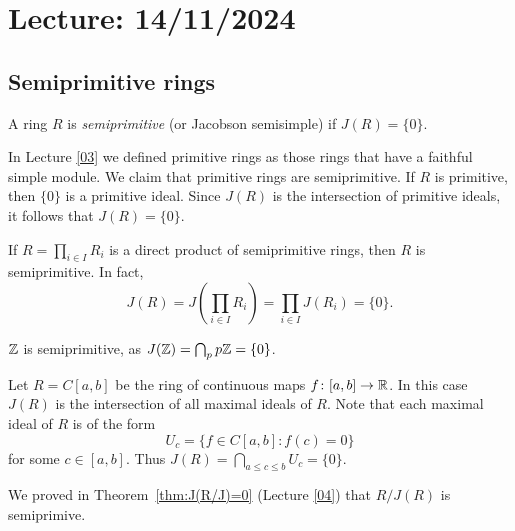 \section{Lecture: 14/11/2024}



\subsection{Semiprimitive rings}

\begin{definition}
	A ring $R$ is \emph{semiprimitive} (or Jacobson semisimple) if  $J(R)=\{0\}$.
\end{definition}

In Lecture \ref{03} we defined primitive rings as
those rings that have a faithful simple module.  We claim that primitive rings
are semiprimitive. If $R$ is primitive, then $\{0\}$ is a primitive ideal. Since
$J(R)$ is the intersection of primitive ideals, it follows that $J(R)=\{0\}$.

\begin{example}
	If $R=\prod_{i\in I}R_i$ is a direct product of semiprimitive rings, then
	$R$ is semiprimitive. In fact, 
	\[
		J(R)=J\left(\prod_{i\in I}R_i\right)=\prod_{i\in I}J(R_i)=\{0\}.
	\]
\end{example}

\begin{example}
$\mathbb{Z}$ is semiprimitive, as $J(\mathbb{Z})=\bigcap_{p}p\mathbb{Z}=\{0\}$.
\end{example}

\begin{example}
	\label{exa:C[a,b]}
	Let $R=C[a,b]$ be the ring of continuous maps $f\colon [a,b]\to\mathbb{R}$. 
	In this case $J(R)$ is the intersection of all maximal ideals of $R$. Note that 
	each maximal ideal of $R$ is of the form 
	\[
		U_c=\{f\in C[a,b]:f(c)=0\}
	\]
	for some $c\in[a,b]$. 
	Thus $J(R)=\bigcap_{a\leq c\leq
	b}U_c=\{0\}$.
\end{example}

We proved in Theorem~\ref{thm:J(R/J)=0} (Lecture \ref{04}) 
that $R/J(R)$ is semiprimive. 

%
%


